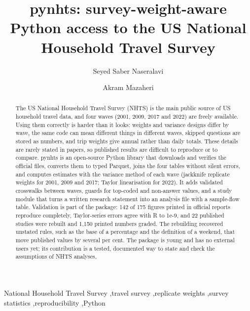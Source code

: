 \documentclass[preprint,12pt, a4paper]{elsarticle}
\begin{document}
\renewcommand{\labelenumii}{\arabic{enumi}.\arabic{enumii}}

\begin{frontmatter}

\title{pynhts: survey-weight-aware Python access to the US National Household Travel Survey}

\author[affa]{Seyed Saber Naseralavi}
\author[affb]{Akram Mazaheri}

\address[affa]{Department of Civil Engineering, Shahid Bahonar University of Kerman, Kerman 7616914111, Iran}
\address[affb]{Department of Civil and Environmental Engineering, Tarbiat Modares University, Tehran 1411944961, Iran}

\begin{abstract}
The US National Household Travel Survey (NHTS) is the main public source of US household travel data, and four waves (2001, 2009, 2017 and 2022) are freely available. Using them correctly is harder than it looks: weights and variance designs differ by wave, the same code can mean different things in different waves, skipped questions are stored as numbers, and trip weights give annual rather than daily totals. These details are rarely stated in papers, so published results are difficult to reproduce or to compare. pynhts is an open-source Python library that downloads and verifies the official files, converts them to typed Parquet, joins the four tables without silent errors, and computes estimates with the variance method of each wave (jackknife replicate weights for 2001, 2009 and 2017; Taylor linearisation for 2022). It adds validated crosswalks between waves, guards for top-coded and non-answer values, and a study module that turns a written research statement into an analysis file with a sample-flow table. Validation is part of the package: 142 of 175 figures printed in official reports reproduce completely, Taylor-series errors agree with R to 1e-9, and 22 published studies were rebuilt and 1,150 printed numbers graded. The rebuilding recovered unstated rules, such as the base of a percentage and the definition of a weekend, that move published values by several per cent. The package is young and has no external users yet; its contribution is a tested, documented way to state and check the assumptions of NHTS analyses.
\end{abstract}

\begin{keyword}
National Household Travel Survey \sep travel survey \sep replicate weights \sep survey statistics \sep reproducibility \sep Python
\end{keyword}

\end{frontmatter}
\end{document}
